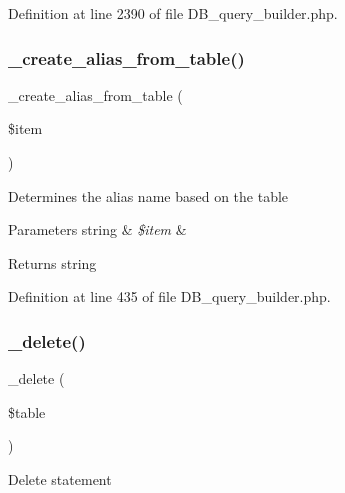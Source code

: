 Definition at line 2390 of file D\+B\+\_\+query\+\_\+builder.\+php.

\mbox{\label{class_c_i___d_b__query__builder_a194edea7be9a8636b67b7d2c8a3de04e}} 
\subsubsection{\texorpdfstring{\_create\_alias\_from\_table()}{\_create\_alias\_from\_table()}}
{\footnotesize\ttfamily \+\_\+create\+\_\+alias\+\_\+from\+\_\+table (\begin{DoxyParamCaption}\item[{}]{\$item }\end{DoxyParamCaption})\hspace{0.3cm}{\ttfamily [protected]}}

Determines the alias name based on the table


\begin{DoxyParams}[1]{Parameters}
string & {\em \$item} & \\
\hline
\end{DoxyParams}
\begin{DoxyReturn}{Returns}
string 
\end{DoxyReturn}


Definition at line 435 of file D\+B\+\_\+query\+\_\+builder.\+php.

\mbox{\label{class_c_i___d_b__query__builder_a133ea8446ded52589bd22cc9163d0896}} 
\subsubsection{\texorpdfstring{\_delete()}{\_delete()}}
{\footnotesize\ttfamily \+\_\+delete (\begin{DoxyParamCaption}\item[{}]{\$table }\end{DoxyParamCaption})\hspace{0.3cm}{\ttfamily [protected]}}

Delete statement

